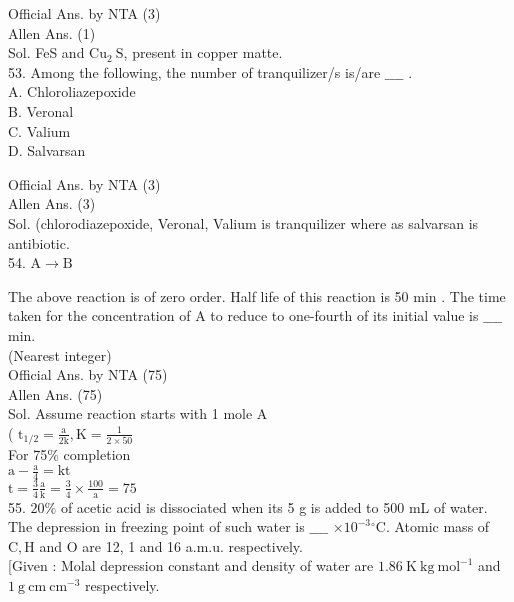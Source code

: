 \documentclass[10pt]{article}
\begin{document}
Official Ans. by NTA (3)\\
Allen Ans. (1)\\
Sol. FeS and \(\mathrm{Cu}_{2} \mathrm{~S}\), present in copper matte.\\
53. Among the following, the number of tranquilizer/s is/are \(\_\_\_\_\) .\\
A. Chloroliazepoxide\\
B. Veronal\\
C. Valium\\
D. Salvarsan

Official Ans. by NTA (3)\\
Allen Ans. (3)\\
Sol. (chlorodiazepoxide, Veronal, Valium is tranquilizer where as salvarsan is antibiotic.\\
54. \(\mathrm{A} \rightarrow \mathrm{B}\)

The above reaction is of zero order. Half life of this reaction is 50 min . The time taken for the concentration of A to reduce to one-fourth of its initial value is \(\_\_\_\_\) min.\\
(Nearest integer)\\
Official Ans. by NTA (75)\\
Allen Ans. (75)\\
Sol. Assume reaction starts with 1 mole A\\
( \(\mathrm{t}_{1 / 2}=\frac{\mathrm{a}}{2 \mathrm{k}}, \mathrm{K}=\frac{1}{2 \times 50}\)\\
For 75\% completion\\
\(\mathrm{a}-\frac{\mathrm{a}}{4}=\mathrm{kt}\)\\
\(\mathrm{t}=\frac{3}{4} \frac{\mathrm{a}}{\mathrm{k}}=\frac{3}{4} \times \frac{100}{\mathrm{a}}=75\)\\
55. \(20 \%\) of acetic acid is dissociated when its 5 g is added to 500 mL of water. The depression in freezing point of such water is \(\_\_\_\_\) \(\times 10^{-3}{ }^{\circ} \mathrm{C}\). Atomic mass of \(\mathrm{C}, \mathrm{H}\) and O are 12, 1 and 16 a.m.u. respectively.\\[0pt]
[Given : Molal depression constant and density of water are \(1.86 \mathrm{~K} \mathrm{~kg} \mathrm{~mol}^{-1}\) and \(1 \mathrm{~g} \mathrm{~cm} \mathrm{~cm}^{-3}\) respectively.
\end{document}
